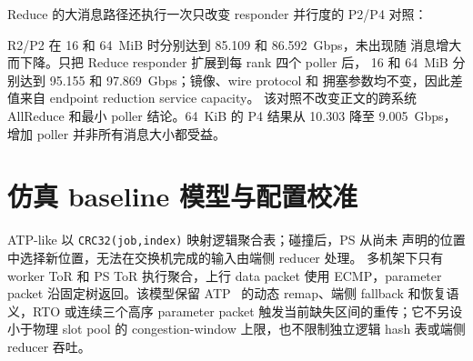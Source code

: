 Reduce 的大消息路径还执行一次只改变 responder 并行度的 P2/P4 对照：

\begin{table}[t]
\centering
\small
\caption{Arbor Reduce 的 responder poller 对照。P2 的 16/64-MiB cell
使用等字节 cold-payload 对照；其余 cell 使用 cache-diverse buffer ring。
每格为五次运行的中位 logical goodput（Gbps）。}
\label{tab:physical-reduce-pollers}
\setlength{\tabcolsep}{3.5pt}
\end{table}

R2/P2 在 16 和 64~MiB 时分别达到 85.109 和 86.592~Gbps，未出现随
消息增大而下降。只把 Reduce responder 扩展到每 rank 四个 poller 后，
16 和 64~MiB 分别达到 95.155 和 97.869~Gbps；镜像、wire protocol 和
拥塞参数均不变，因此差值来自 endpoint reduction service capacity。
该对照不改变正文的跨系统 AllReduce 和最小 poller 结论。64~KiB 的 P4
结果从 10.303 降至 9.005~Gbps，增加 poller 并非所有消息大小都受益。


\chapter{仿真 baseline 模型与配置校准}
\label{app:sim-models}

ATP-like 以 \texttt{CRC32(job,index)} 映射逻辑聚合表；碰撞后，PS 从尚未
声明的位置中选择新位置，无法在交换机完成的输入由端侧 reducer 处理。
多机架下只有 worker ToR 和 PS ToR 执行聚合，上行 data packet 使用
ECMP，parameter packet 沿固定树返回。该模型保留 ATP~\cite{atp} 的动态
remap、端侧 fallback 和恢复语义，RTO 或连续三个高序 parameter packet
触发当前缺失区间的重传；它不另设小于物理 slot pool 的
congestion-window 上限，也不限制独立逻辑 hash 表或端侧 reducer 吞吐。

